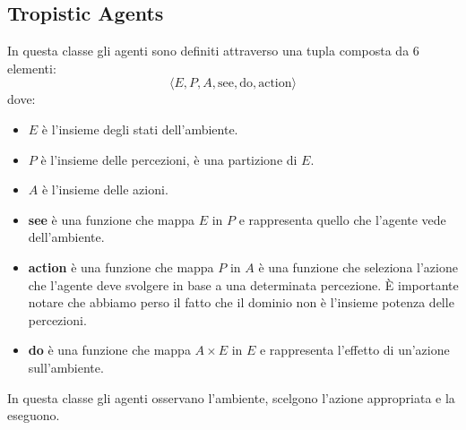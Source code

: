 \subsection{Tropistic Agents}
In questa classe gli agenti sono definiti attraverso una tupla composta da 6
elementi:
\begin{equation*}
    \langle E, P, A, \text{see}, \text{do}, \text{action} \rangle
\end{equation*}
dove:
\begin{itemize}
    \item $E$ è l'insieme degli stati dell'ambiente.
    \item $P$ è l'insieme delle percezioni, è una partizione di $E$.
    \item $A$ è l'insieme delle azioni.
    \item \textbf{see} è una funzione che mappa $E$ in $P$ e rappresenta quello
          che l'agente vede dell'ambiente.
    \item \textbf{action} è una funzione che mappa $P$ in $A$ è una funzione che
          seleziona l'azione che l'agente deve svolgere in base a una determinata
          percezione. È importante notare che abbiamo perso il fatto che il
          dominio non è l'insieme potenza delle percezioni.
    \item \textbf{do} è una funzione che mappa $A \times E$ in $E$ e rappresenta
          l'effetto di un'azione sull'ambiente.
\end{itemize}

In questa classe gli agenti osservano l'ambiente, scelgono l'azione appropriata
e la eseguono.
